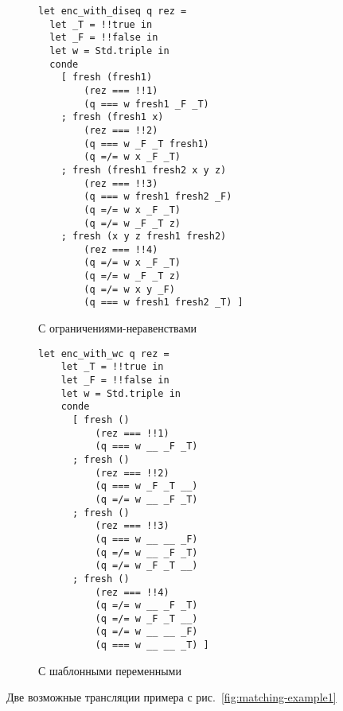\begin{figure*}[t]
\begin{subfigure}{0.49\textwidth}
\begin{lstlisting}
let enc_with_diseq q rez =
  let _T = !!true in
  let _F = !!false in
  let w = Std.triple in
  conde
    [ fresh (fresh1)
        (rez === !!1)
        (q === w fresh1 _F _T)
    ; fresh (fresh1 x)
        (rez === !!2)
        (q === w _F _T fresh1)
        (q =/= w x _F _T)
    ; fresh (fresh1 fresh2 x y z)
        (rez === !!3)
        (q === w fresh1 fresh2 _F)
        (q =/= w x _F _T)
        (q =/= w _F _T z)
    ; fresh (x y z fresh1 fresh2)
        (rez === !!4)
        (q =/= w x _F _T)
        (q =/= w _F _T z)
        (q =/= w x y _F)
        (q === w fresh1 fresh2 _T) ]
\end{lstlisting}
\caption{С ограничениями-неравенствами}
\label{fig:matching-example3}
\end{subfigure}
\begin{subfigure}{0.49\textwidth}
\begin{lstlisting}
let enc_with_wc q rez =
    let _T = !!true in
    let _F = !!false in
    let w = Std.triple in
    conde
      [ fresh ()
          (rez === !!1)
          (q === w __ _F _T)
      ; fresh ()
          (rez === !!2)
          (q === w _F _T __)
          (q =/= w __ _F _T)
      ; fresh ()
          (rez === !!3)
          (q === w __ __ _F)
          (q =/= w __ _F _T)
          (q =/= w _F _T __)
      ; fresh ()
          (rez === !!4)
          (q =/= w __ _F _T)
          (q =/= w _F _T __)
          (q =/= w __ __ _F)
          (q === w __ __ _T) ]
\end{lstlisting}
\caption{С шаблонными переменными}
\label{fig:matching-example4}
\end{subfigure}
\caption{Две возможные трансляции примера с рис.~\ref{fig:matching-example1}}
\label{fig:maranget-example-compilation}
\end{figure*}

